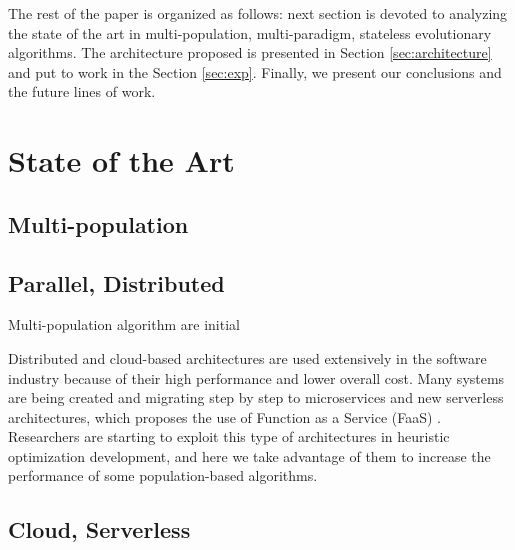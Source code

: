 \documentclass[runningheads]{llncs}
\begin{document}


The rest of the paper is organized as follows: next section is devoted
to analyzing the state of the art in multi-population, multi-paradigm,
stateless evolutionary algorithms. The architecture proposed is
presented in Section \ref{sec:architecture} and put to work in the
Section \ref{sec:exp}. Finally, we present our conclusions and the
future lines of work.

\section{State of the Art}

\subsection{Multi-population}





\subsection{Parallel, Distributed}
Multi-population algorithm are initial



Distributed and cloud-based architectures are used extensively in the software
industry because of their high performance and lower overall cost. Many systems
are being created and migrating step by step to microservices and new serverless
architectures, which proposes the use of Function as a Service (FaaS) 
\cite{Hellerstein2018,Everywhere,Baird2016}. 
Researchers are starting to exploit this type of architectures in heuristic optimization
development, and here we take advantage of them to increase the performance of
some population-based algorithms.

\subsection{Cloud, Serverless}
\end{document}
